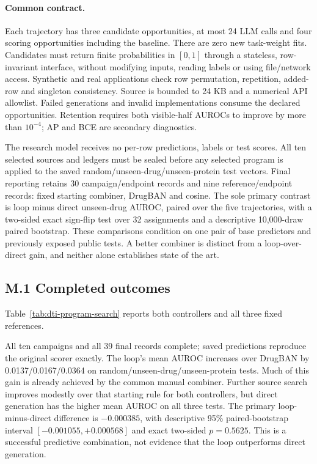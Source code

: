 \paragraph{Common contract.}
Each trajectory has three candidate opportunities, at most 24 LLM calls and four scoring opportunities including the baseline. There are zero new task-weight fits. Candidates must return finite probabilities in $[0,1]$ through a stateless, row-invariant interface, without modifying inputs, reading labels or using file/network access. Synthetic and real applications check row permutation, repetition, added-row and singleton consistency. Source is bounded to 24 KB and a numerical API allowlist. Failed generations and invalid implementations consume the declared opportunities. Retention requires both visible-half AUROCs to improve by more than $10^{-4}$; AP and BCE are secondary diagnostics.

The research model receives no per-row predictions, labels or test scores. All ten selected sources and ledgers must be sealed before any selected program is applied to the saved random/unseen-drug/unseen-protein test vectors. Final reporting retains 30 campaign/endpoint records and nine reference/endpoint records: fixed starting combiner, DrugBAN and cosine. The sole primary contrast is loop minus direct unseen-drug AUROC, paired over the five trajectories, with a two-sided exact sign-flip test over 32 assignments and a descriptive 10,000-draw paired bootstrap. These comparisons condition on one pair of base predictors and previously exposed public tests. A better combiner is distinct from a loop-over-direct gain, and neither alone establishes state of the art.

\subsection*{M.1 Completed outcomes}
Table~\ref{tab:dti-program-search} reports both controllers and all three fixed references.

All ten campaigns and all 39 final records complete; saved predictions reproduce the original scorer exactly. The loop's mean AUROC increases over DrugBAN by 0.0137/0.0167/0.0364 on random/unseen-drug/unseen-protein tests. Much of this gain is already achieved by the common manual combiner. Further source search improves modestly over that starting rule for both controllers, but direct generation has the higher mean AUROC on all three tests. The primary loop-minus-direct difference is $-0.000385$, with descriptive 95\% paired-bootstrap interval $[-0.001055,+0.000568]$ and exact two-sided $p=0.5625$. This is a successful predictive combination, not evidence that the loop outperforms direct generation.

